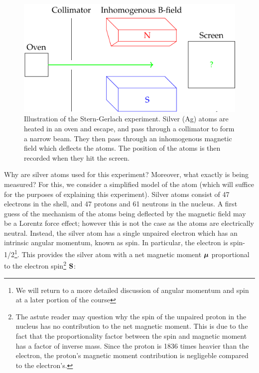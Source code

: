 \begin{figure}[htbp]
    \centering
    \includegraphics[]{Images/fig-SGexpsketch.pdf}
    \caption{Illustration of the Stern-Gerlach experiment. Silver (Ag) atoms are heated in an oven and escape, and pass through a collimator to form a narrow beam. They then pass through an inhomogenous magnetic field which deflects the atoms. The position of the atoms is then recorded when they hit the screen.}
    \label{fig-SGexpsketch}
\end{figure}

Why are silver atoms used for this experiment? Moreover, what exactly is being measured? For this, we consider a simplified model of the atom (which will suffice for the purposes of explaining this experiment). Silver atoms consist of 47 electrons in the shell, and 47 protons and 61 neutrons in the nucleus. A first guess of the mechanism of the atoms being deflected by the magnetic field may be a Lorentz force effect; however this is not the case as the atoms are electrically neutral. Instead, the silver atom has a single unpaired electron which has an intrinsic angular momentum, known as spin. In particular, the electron is spin-1/2\footnote{We will return to a more detailed discussion of angular momentum and spin at a later portion of the course}. This provides the silver atom with a net magnetic moment $\mbox{\boldmath$ \mu $}$ proportional to the electron spin\footnote{The astute reader may question why the spin of the unpaired proton in the nucleus has no contribution to the net magnetic moment. This is due to the fact that the proportionality factor between the spin and magnetic moment has a factor of inverse mass. Since the proton is 1836 times heavier than the electron, the proton's magnetic moment contribution is negligeble compared to the electron's.} $\mathbf{S}$:

